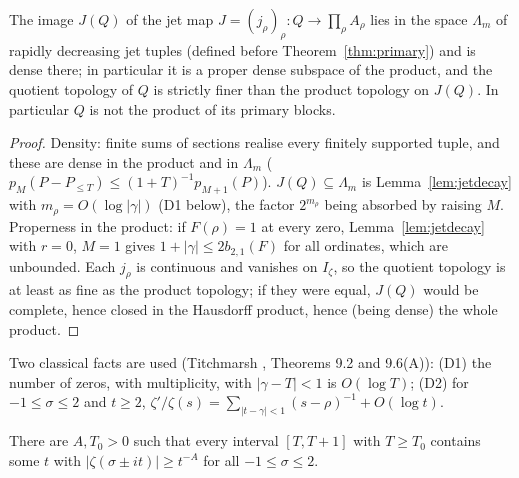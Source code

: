 \begin{corollary}\label{cor:jetimage}
The image $J(Q)$ of the jet map $J=(j_\rho)_\rho:Q\to\prod_\rho A_\rho$ lies in the space $\Lambda_m$ of rapidly decreasing jet tuples (defined before Theorem~\ref{thm:primary}) and is dense there; in particular it is a proper dense subspace of the product, and the quotient topology of $Q$ is strictly finer than the product topology on $J(Q)$. In particular $Q$ is not the product of its primary blocks.
\end{corollary}

\begin{proof}
Density: finite sums of sections realise every finitely supported tuple, and these are dense in the product and in $\Lambda_m$ ($p_M(P-P_{\le T})\le(1+T)^{-1}p_{M+1}(P)$). $J(Q)\subseteq\Lambda_m$ is Lemma~\ref{lem:jetdecay} with $m_\rho=O(\log|\gamma|)$ (D1 below), the factor $2^{m_\rho}$ being absorbed by raising $M$. Properness in the product: if $F(\rho)=1$ at every zero, Lemma~\ref{lem:jetdecay} with $r=0$, $M=1$ gives $1+|\gamma|\le2b_{2,1}(F)$ for all ordinates, which are unbounded.
Each $j_\rho$ is continuous and vanishes on $I_\zeta$, so the quotient topology is at least as fine as the product topology; if they were equal, $J(Q)$ would be complete, hence closed in the Hausdorff product, hence (being dense) the whole product.
\end{proof}

Two classical facts are used (Titchmarsh \cite{Titchmarsh}, Theorems 9.2 and 9.6(A)):
(D1) the number of zeros, with multiplicity, with $|\gamma-T|<1$ is $O(\log T)$;
(D2) for $-1\le\sigma\le2$ and $t\ge2$, $\zeta'/\zeta(s)=\sum_{|t-\gamma|<1}(s-\rho)^{-1}+O(\log t)$.

\begin{lemma}\label{lem:goodheights}
There are $A,T_0>0$ such that every interval $[T,T+1]$ with $T\ge T_0$ contains some $t$ with $|\zeta(\sigma\pm it)|\ge t^{-A}$ for all $-1\le\sigma\le2$.
\end{lemma}

